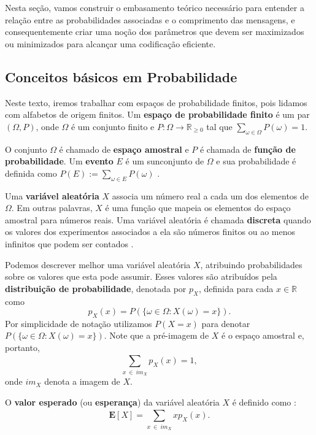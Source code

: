 Nesta seção, vamos construir o embasamento teórico necessário para entender a relação entre as probabilidades associadas e o comprimento das mensagens, e consequentemente criar uma noção dos parâmetros que devem ser maximizados ou minimizados para alcançar uma codificação eficiente.

\subsection{Conceitos básicos em Probabilidade}
Neste texto, iremos trabalhar com espaços de probabilidade finitos,
pois lidamos com alfabetos de origem finitos. Um \textbf{espaço de
  probabilidade finito} é um par $(\Omega, P)$, onde $\Omega$ é um
conjunto finito e $P\colon \Omega \to \mathbb{R}_{\geq 0}$ tal que
$\sum_{\omega \in \Omega} P(\omega) = 1$.

O conjunto $\Omega$ é chamado de \textbf{espaço amostral} e $P$ é
chamada de \textbf{função de probabilidade}. Um \textbf{evento} $E$ é
um sunconjunto de $\Omega$ e sua probabilidade é definida como $P(E)
:= \sum_{\omega \in E} P(\omega)$ \cite{BT}.

Uma \textbf{variável aleatória} $X$ associa um número real a cada
um dos elementos de $\Omega$. Em outras palavras, $X$ é uma
função que mapeia os elementos do espaço amostral para números
reais. Uma variável aleatória é chamada \textbf{discreta} quando os
valores dos experimentos associados a ela são números finitos ou ao
menos infinitos que podem ser contados \cite{BT}.

Podemos descrever melhor uma variável aleatória $X$, atribuindo
probabilidades sobre os valores que esta pode assumir. Esses valores
são atribuídos pela \textbf{distribuição de probabilidade}, denotada
por $p_X$, definida para cada $x\in\mathbb{R}$ como
\begin{equation} \label{eq:dist_prob_def}
p_X(x) = P(\{\omega\in \Omega: X(\omega) = x\}).
\end{equation}
Por simplicidade de notação utilizamos $P(X=x)$ para denotar
$P(\{\omega\in \Omega: X(\omega) = x\})$. Note que a pré-imagem de $X$
é o espaço amostral e, portanto,
\begin{equation} \label{eq:dist_prob_sum}
\sum_{x ~\in ~im_X}^{}p_X(x) = 1,
\end{equation}
onde $im_X$ denota a imagem de $X$.

O \textbf{valor esperado} (ou \textbf{esperança}) da variável aleatória $X$ é definido como \cite{BT}:
\begin{equation} \label{eq:exp_val}
\textbf{E}[X] = \sum_{x ~\in ~im_X}^{} xp_X(x).
\end{equation}
